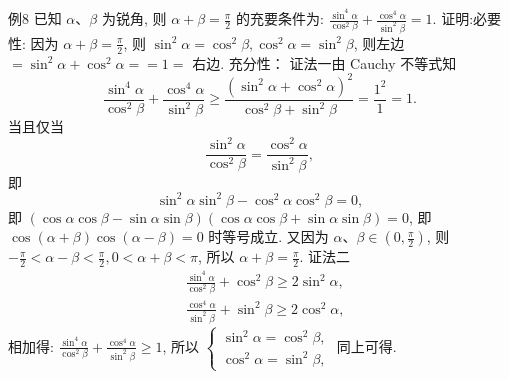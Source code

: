 例8 已知 $\alpha 、 \beta$ 为锐角, 则 $\alpha+\beta=\frac{\pi}{2}$ 的充要条件为: $\frac{\sin ^4 \alpha}{\cos ^2 \beta}+\frac{\cos ^4 \alpha}{\sin ^2 \beta}=1$.
证明:必要性: 因为 $\alpha+\beta=\frac{\pi}{2}$, 则 $\sin ^2 \alpha=\cos ^2 \beta, \cos ^2 \alpha=\sin ^2 \beta$, 则左边 $=\sin ^2 \alpha+\cos ^2 \alpha==1=$ 右边.
充分性：
证法一由 Cauchy 不等式知
$$
\frac{\sin ^4 \alpha}{\cos ^2 \beta}+\frac{\cos ^4 \alpha}{\sin ^2 \beta} \geqslant \frac{\left(\sin ^2 \alpha+\cos ^2 \alpha\right)^2}{\cos ^2 \beta+\sin ^2 \beta}=\frac{1^2}{1}=1 .
$$
当且仅当
$$
\frac{\sin ^2 \alpha}{\cos ^2 \beta}=\frac{\cos ^2 \alpha}{\sin ^2 \beta},
$$
即
$$
\sin ^2 \alpha \sin ^2 \beta-\cos ^2 \alpha \cos ^2 \beta=0,
$$
即 $(\cos \alpha \cos \beta-\sin \alpha \sin \beta)(\cos \alpha \cos \beta+\sin \alpha \sin \beta)=0$,
即 $\cos (\alpha+\beta) \cos (\alpha-\beta)=0$ 时等号成立.
又因为 $\alpha 、 \beta \in\left(0, \frac{\pi}{2}\right)$, 则 $-\frac{\pi}{2}<\alpha-\beta<\frac{\pi}{2}, 0<\alpha+\beta<\pi$, 所以 $\alpha+\beta= \frac{\pi}{2}$.
证法二
$$
\begin{aligned}
& \frac{\sin ^4 \alpha}{\cos ^2 \beta}+\cos ^2 \beta \geqslant 2 \sin ^2 \alpha, \\
& \frac{\cos ^4 \alpha}{\sin ^2 \beta}+\sin ^2 \beta \geqslant 2 \cos ^2 \alpha,
\end{aligned}
$$
相加得: $\frac{\sin ^4 \alpha}{\cos ^2 \beta}+\frac{\cos ^4 \alpha}{\sin ^2 \beta} \geqslant 1$, 所以 $\left\{\begin{array}{l}\sin ^2 \alpha=\cos ^2 \beta, \\ \cos ^2 \alpha=\sin ^2 \beta,\end{array}\right.$ 同上可得.



